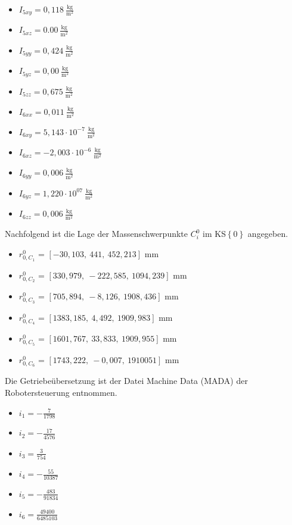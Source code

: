 \begin{itemize}
	\item $I_{5xy} = 0,118~\frac{\text{kg}}{\text{m}^2}$
	\item $I_{5xz} = 0.00~\frac{\text{kg}}{\text{m}^2}$
	\item $I_{5yy} = 0,424~\frac{\text{kg}}{\text{m}^2}$
	\item $I_{5yz} = 0,00~\frac{\text{kg}}{\text{m}^2}$
	\item $I_{5zz} = 0,675~\frac{\text{kg}}{\text{m}^2}$
	\\
	\item $I_{6xx} = 0,011~\frac{\text{kg}}{\text{m}^2}$
	\item $I_{6xy} = 5,143\cdot10^{-7}~\frac{\text{kg}}{\text{m}^2}$
	\item $I_{6xz} = -2,003\cdot10^{-6}~\frac{\text{kg}}{\text{m}^2}$
	\item $I_{6yy} = 0,006~\frac{\text{kg}}{\text{m}^2}$
	\item $I_{6yz} = 1,220\cdot10^{07}~\frac{\text{kg}}{\text{m}^2}$
	\item $I_{6zz} = 0,006~\frac{\text{kg}}{\text{m}^2}$
\end{itemize}
%
Nachfolgend ist die Lage der Massenschwerpunkte $C_i^0$ im KS$\left\{0\right\}$ angegeben. 
% 
\begin{itemize}
	\item $r_{0,C_1}^0$ = $\left[-30,103,~441,~452,213\right]$ mm
	\item $r_{0,C_2}^0$ = $\left[330,979,~-222,585,~1094,239\right]$ mm
	\item $r_{0,C_3}^0$ = $\left[705,894,~-8,126,~1908,436\right]$ mm
	\item $r_{0,C_4}^0$ = $\left[1383,185,~4,492,~1909,983\right]$ mm
	\item $r_{0,C_5}^0$ = $\left[1601,767,~33,833,~1909,955\right]$ mm
	\item $r_{0,C_6}^0$ = $\left[1743,222,~-0,007,~1910 051\right]$ mm
\end{itemize}
%
Die Getriebeübersetzung ist der Datei Machine Data (MADA) der Robotersteuerung entnommen.
%
\begin{itemize}
	\item $i_1 = -\frac{7}{1798}$
	\item $i_2 = -\frac{17}{4576}$
	\item $i_3 = \frac{3}{754}$
	\item $i_4 = -\frac{55}{10387}$
	\item $i_5 = -\frac{483}{91834}$
	\item $i_6 = \frac{49400}{6485103}$
\end{itemize}
%
\setcounter{chapter}{3}
\setcounter{section}{0}
\setcounter{table}{0}
\setcounter{figure}{0}
